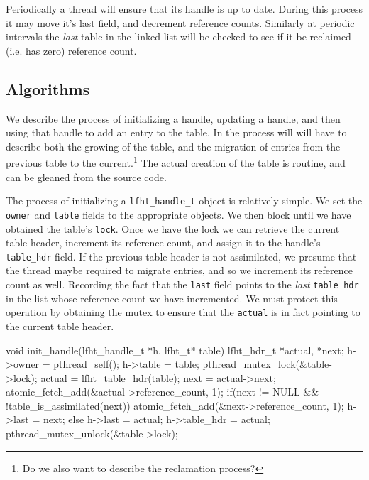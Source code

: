 Periodically a thread will ensure that its handle is up to date. During this process
it may move it's last field, and decrement reference counts. Similarly
at periodic intervals the {\em last} table in the linked list will be checked to see
if it be reclaimed (i.e. has zero) reference count.


\subsection{Algorithms}


We describe the process of initializing a handle, updating a handle, and then using that handle
to add an entry to the table. In the process will will have to describe both the growing of the table,
and the migration of entries from the previous table to the
current.\footnote{Do we also want to describe the reclamation process?}
The actual creation of the table is routine,
and can be gleaned from the source code\cite{lfht2017}.


The process of initializing a \texttt{lfht\_handle\_t} object is relatively simple.
We set the \texttt{owner} and  \texttt{table} fields to the appropriate objects.
We then block until we have obtained the table's \texttt{lock}. Once we have the lock
we can retrieve the current table header, increment its reference count, and
assign it to the handle's \texttt{table\_hdr} field. If the previous table header
is not assimilated, we presume that the thread maybe required to migrate entries,
and so we increment its reference count as well. Recording the fact that
the \texttt{last} field points to the {\em last}  \texttt{table\_hdr} in the list
whose reference count we have incremented.
We must protect this operation by obtaining the mutex to ensure that the \texttt{actual}
is in fact pointing to the current table header.


\begin{center}
\begin{clisting}
void init_handle(lfht_handle_t *h, lfht_t* table){
  lfht_hdr_t *actual, *next;
  h->owner = pthread_self();
  h->table = table;
  pthread_mutex_lock(&table->lock);
  actual = lfht_table_hdr(table);
  next = actual->next;
  atomic_fetch_add(&actual->reference_count, 1);
  if(next != NULL && !table_is_assimilated(next)){
    atomic_fetch_add(&next->reference_count, 1);
    h->last = next;
  } else {
    h->last = actual;
  }
  h->table_hdr = actual;
  pthread_mutex_unlock(&table->lock);
}
\end{clisting}
\end{center}

